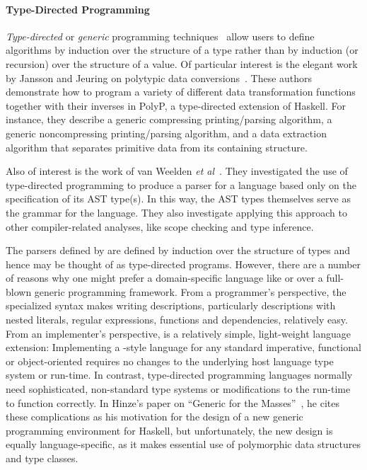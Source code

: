 \paragraph*{Type-Directed Programming}
{\em Type-directed} or
{\em generic} programming techniques~\cite{jansson+:97,jansson+:99,jansson:phdthesis,hinze+:generic-programming,jansson+:02,lammel+:syb} allow users to
define algorithms by induction over the structure of a type rather 
than by induction (or recursion) over the structure of a value.  
Of particular interest is the
elegant work by Jansson and Jeuring on polytypic data 
conversions~\cite{jansson+:97,jansson+:99,jansson:phdthesis,jansson+:02}.
These authors demonstrate how to program a variety of different data 
transformation functions together with their inverses in PolyP, a 
type-directed extension of Haskell. For instance, they describe a 
generic compressing printing/parsing algorithm, a generic 
noncompressing printing/parsing algorithm, and a data
extraction algorithm that separates primitive data from its
containing structure.  

Also of interest is the work of 
van Weelden \textit{et al}~\cite{weelden+:polytypic-ast}.
They investigated the use of
type-directed programming to produce a parser for a language based only on
the specification of its AST type(s). In this way, the AST types
themselves serve as the grammar for the language. They also
investigate applying this approach to other compiler-related analyses,
like scope checking and type inference.

The parsers defined by \ddc{} are defined by induction over the structure
of types and hence may be thought of as type-directed programs.  However,
there are a number of reasons why one might prefer a domain-specific
language like \pads{} or \ddc{} over a full-blown
generic programming framework.  
From a programmer's perspective, the specialized syntax makes writing
descriptions, particularly descriptions with nested literals, 
regular expressions, functions and dependencies, relatively easy.
From an implementer's perspective, \pads{} is a
relatively simple, light-weight language extension:  Implementing a 
\pads{}-style language for any standard imperative, functional or 
object-oriented requires no changes to the underlying host language
type system or run-time.  In contrast, type-directed
programming languages normally need sophisticated, non-standard type systems
or modifications to the run-time to function correctly.  In Hinze's
paper on ``Generic for the Masses''~\cite{hinze:masses}, he cites these
complications as his motivation for the design of a new generic programming
environment for Haskell, but unfortunately, the new design is equally 
language-specific, as it makes essential use of polymorphic data structures
and type classes.  


